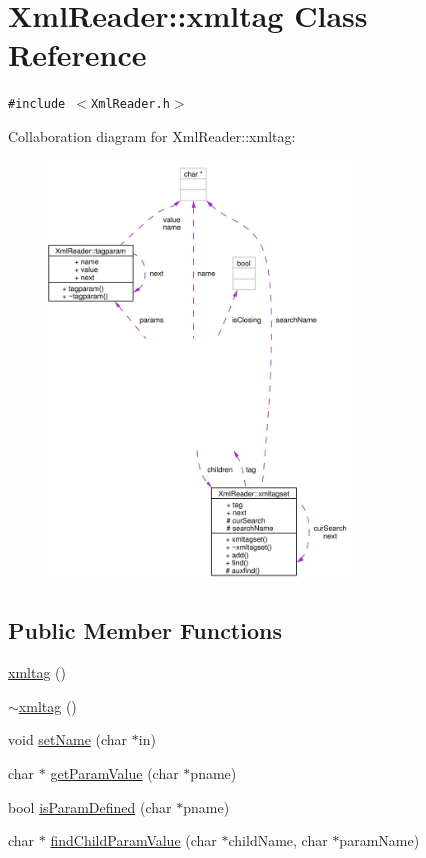 \hypertarget{classXmlReader_1_1xmltag}{
\section{Xml\-Reader::xmltag Class Reference}
\label{classXmlReader_1_1xmltag}
}
{\tt \#include $<$Xml\-Reader.h$>$}

Collaboration diagram for Xml\-Reader::xmltag:\begin{figure}[H]
\begin{center}
\leavevmode
\includegraphics[width=228pt]{classXmlReader_1_1xmltag__coll__graph}
\end{center}
\end{figure}
\subsection*{Public Member Functions}
\begin{CompactItemize}
\item 
\hyperlink{classXmlReader_1_1xmltag_a0}{xmltag} ()
\item 
\hyperlink{classXmlReader_1_1xmltag_a1}{$\sim$xmltag} ()
\item 
void \hyperlink{classXmlReader_1_1xmltag_a2}{set\-Name} (char $\ast$in)
\item 
char $\ast$ \hyperlink{classXmlReader_1_1xmltag_a3}{get\-Param\-Value} (char $\ast$pname)
\item 
bool \hyperlink{classXmlReader_1_1xmltag_a4}{is\-Param\-Defined} (char $\ast$pname)
\item 
char $\ast$ \hyperlink{classXmlReader_1_1xmltag_a5}{find\-Child\-Param\-Value} (char $\ast$child\-Name, char $\ast$param\-Name)
\end{CompactItemize}
